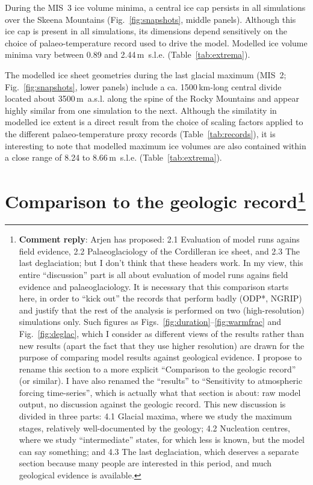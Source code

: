 \documentclass[tc, manuscript]{copernicus}
\newcommand{\renote}[1]{\footnote{\textbf{Comment reply}: #1}}
\begin{document}
During the MIS~3 ice volume minima, a central ice cap persists in all
simulations over the Skeena Mountains (Fig.~\ref{fig:snapshots}, middle
panels). Although this ice cap is present in all simulations, its dimensions
depend sensitively on the choice of palaeo-temperature record used to drive the
model. Modelled ice volume minima vary between 0.89 and 2.44\,m~s.l.e.
(Table~\ref{tab:extrema}).

The modelled ice sheet geometries during the last glacial maximum (MIS~2;
Fig.~\ref{fig:snapshots}, lower panels) include a ca. 1500\,km-long central
divide located about 3500\,m~a.s.l. along the spine of the Rocky Mountains and
appear highly similar from one simulation to the next. Although the similatity
in modelled ice extent is a direct result from the choice of scaling factors
applied to the different palaeo-temperature proxy records
(Table~\ref{tab:records}), it is interesting to note that modelled maximum ice
volumes are also contained within a close range of 8.24 to 8.66\,m~s.l.e.
(Table~\ref{tab:extrema}).

\section[Comparison to the geologic record]
        {Comparison to the geologic record\renote{
    Arjen has proposed: 2.1 Evaluation of model runs agains field evidence, 2.2
    Palaeoglaciology of the Cordilleran ice sheet, and 2.3 The last
    deglaciation; but I don't think that these headers work. In my view, this
    entire ``discussion'' part is all about evaluation of model runs agains
    field evidence and palaeoglaciology. It is necessary that this comparison
    starts here, in order to ``kick out'' the records that perform badly (ODP*,
    NGRIP) and justify that the rest of the analysis is performed on two
    (high-resolution) simulations only. Such figures as
    Figs.~\ref{fig:duration}--\ref{fig:warmfrac} and Fig.~\ref{fig:deglac},
    which I consider as different views of the results rather than new results
    (apart the fact that they use higher resolution) are drawn for the purpose
    of comparing model results against geological evidence. I propose to rename
    this section to a more explicit ``Comparison to the geologic record'' (or
    similar). I have also renamed the ``results'' to ``Sensitivity to
    atmospheric forcing time-series'', which is actually what that section is
    about: raw model output, no discussion against the geologic record. This
    new discussion is divided in three parts: 4.1 Glacial maxima, where we
    study the maximum stages, relatively well-documented by the geology; 4.2
    Nucleation centres, where we study ``intermediate'' states, for which less
    is known, but the model can say something; and 4.3 The last deglaciation,
    which deserves a separate section because many people are interested in
    this period, and much geological evidence is available.}}
\label{sec:discussion}
\end{document}
